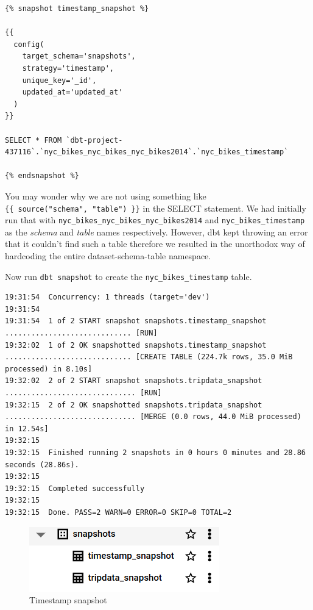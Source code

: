 \documentclass[
]{book}
\begin{document}
\begin{verbatim}
{% snapshot timestamp_snapshot %}

{{
  config(      
    target_schema='snapshots',      
    strategy='timestamp',      
    unique_key='_id',      
    updated_at='updated_at'    
  )  
}}  

SELECT * FROM `dbt-project-437116`.`nyc_bikes_nyc_bikes_nyc_bikes2014`.`nyc_bikes_timestamp`

{% endsnapshot %}
\end{verbatim}

You may wonder why we are not using something like \texttt{\{\{\ source("schema",\ "table")\ \}\}} in the SELECT statement. We had initially run that with \texttt{nyc\_bikes\_nyc\_bikes\_nyc\_bikes2014} and \texttt{nyc\_bikes\_timestamp} as the \emph{schema} and \emph{table} names respectively. However, dbt kept throwing an error that it couldn't find such a table therefore we resulted in the unorthodox way of hardcoding the entire dataset-schema-table namespace.

Now run \texttt{dbt\ snapshot} to create the \texttt{nyc\_bikes\_timestamp} table.

\begin{verbatim}
19:31:54  Concurrency: 1 threads (target='dev')
19:31:54  
19:31:54  1 of 2 START snapshot snapshots.timestamp_snapshot ............................. [RUN]
19:32:02  1 of 2 OK snapshotted snapshots.timestamp_snapshot ............................. [CREATE TABLE (224.7k rows, 35.0 MiB processed) in 8.10s]
19:32:02  2 of 2 START snapshot snapshots.tripdata_snapshot .............................. [RUN]
19:32:15  2 of 2 OK snapshotted snapshots.tripdata_snapshot .............................. [MERGE (0.0 rows, 44.0 MiB processed) in 12.54s]
19:32:15  
19:32:15  Finished running 2 snapshots in 0 hours 0 minutes and 28.86 seconds (28.86s).
19:32:15  
19:32:15  Completed successfully
19:32:15  
19:32:15  Done. PASS=2 WARN=0 ERROR=0 SKIP=0 TOTAL=2
\end{verbatim}

\begin{figure}
\centering
\includegraphics{./images/timestamp_snapshot_created.png}
\caption{Timestamp snapshot}
\end{figure}
\end{document}
